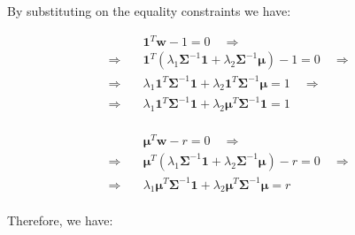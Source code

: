 \documentclass{beamer}
\begin{document}
\begin{frame}

\justifying
By substituting on the equality constraints we have:

\justifying
\begin{equation*}
\begin{aligned}
	& \mathbf{1}^{T}\mathbf{w} - 1 = 0 \quad \Rightarrow \\
	\Rightarrow \quad & \mathbf{1}^{T} \left(\lambda_{1} \mathbf{\Sigma}^{-1}\mathbf{1} + \lambda_{2} \mathbf{\Sigma}^{-1}\boldsymbol\mu\right) - 1 = 0 \quad \Rightarrow \\
	\Rightarrow \quad & \lambda_{1} \mathbf{1}^{T} \mathbf{\Sigma}^{-1}\mathbf{1} + \lambda_{2} \mathbf{1}^{T} \mathbf{\Sigma}^{-1}\boldsymbol\mu = 1 \quad \Rightarrow \\
	\Rightarrow \quad & \lambda_{1} \mathbf{1}^{T} \mathbf{\Sigma}^{-1}\mathbf{1} + \lambda_{2} \boldsymbol\mu^{T} \mathbf{\Sigma}^{-1}\mathbf{1} = 1 \\
\end{aligned}
\end{equation*}

\justifying
\begin{equation*}
\begin{aligned}
	& \boldsymbol\mu^{T}\mathbf{w} - r = 0 \quad \Rightarrow \\
	\Rightarrow \quad & \boldsymbol\mu^{T} \left(\lambda_{1} \mathbf{\Sigma}^{-1}\mathbf{1} + \lambda_{2} \mathbf{\Sigma}^{-1}\boldsymbol\mu\right) - r = 0 \quad \Rightarrow \\
	\Rightarrow \quad & \lambda_{1} \boldsymbol\mu^{T} \mathbf{\Sigma}^{-1}\mathbf{1} + \lambda_{2} \boldsymbol\mu^{T} \mathbf{\Sigma}^{-1}\boldsymbol\mu = r \\
\end{aligned}
\end{equation*}

\vspace{0.2cm}
\justifying
Therefore, we have:


\end{frame}
\end{document}
